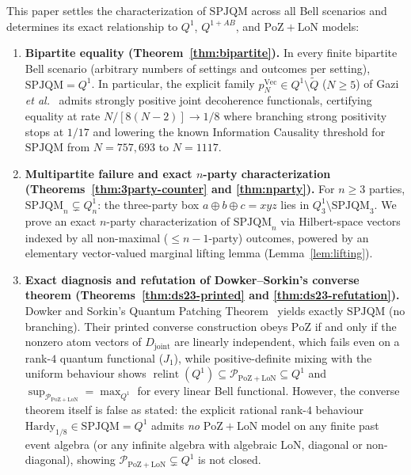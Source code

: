 \documentclass[11pt,a4paper]{article}
\theoremstyle{definition}
\theoremstyle{remark}
\newcommand{\SPJQM}{\mathrm{SPJQM}}
\newcommand{\Qone}{Q^{1}}
\newcommand{\QAB}{Q^{1+AB}}
\newcommand{\tQ}{\widetilde{Q}}
\newcommand{\PoZ}{\mathrm{PoZ}}
\newcommand{\LoN}{\mathrm{LoN}}
\newcommand{\PPoZ}{\mathcal{P}_{\PoZ+\LoN}}
\newcommand{\relint}{\operatorname{relint}}
\begin{document}
This paper settles the characterization of $\SPJQM$ across all Bell scenarios and determines its exact relationship to $\Qone$, $\QAB$, and $\PoZ+\LoN$ models:
\begin{enumerate}[leftmargin=*,nosep]
\item \textbf{Bipartite equality (Theorem~\ref{thm:bipartite}).} In every finite bipartite Bell scenario (arbitrary numbers of settings and outcomes per setting), $\SPJQM = \Qone$. In particular, the explicit family $p^{\mathrm{Vec}}_N \in \Qone \setminus \tQ$ ($N \ge 5$) of Gazi \emph{et al.}~\cite{Gazi2026} admits strongly positive joint decoherence functionals, certifying equality at rate $N/[8(N-2)] \to 1/8$ where branching strong positivity stops at $1/17$ and lowering the known Information Causality threshold for $\SPJQM$ from $N = 757{,}693$ to $N = 1117$.
\item \textbf{Multipartite failure and exact $n$-party characterization (Theorems~\ref{thm:3party-counter} and \ref{thm:nparty}).} For $n \ge 3$ parties, $\SPJQM_n \subsetneq \Qone_n$: the three-party box $a\oplus b\oplus c = xyz$ lies in $\Qone_3 \setminus \SPJQM_3$. We prove an exact $n$-party characterization of $\SPJQM_n$ via Hilbert-space vectors indexed by all non-maximal ($\le n-1$-party) outcomes, powered by an elementary vector-valued marginal lifting lemma (Lemma~\ref{lem:lifting}).
\item \textbf{Exact diagnosis and refutation of Dowker--Sorkin's converse theorem (Theorems~\ref{thm:ds23-printed} and \ref{thm:ds23-refutation}).} Dowker and Sorkin's Quantum Patching Theorem~\cite{DowkerSorkin2023} yields exactly $\SPJQM$ (no branching). Their printed converse construction obeys $\PoZ$ if and only if the nonzero atom vectors of $D_{\mathrm{joint}}$ are linearly independent, which fails even on a rank-$4$ quantum functional ($J_1$), while positive-definite mixing with the uniform behaviour shows $\relint(\Qone) \subseteq \PPoZ \subseteq \Qone$ and $\sup_{\PPoZ} = \max_{\Qone}$ for every linear Bell functional. However, the converse theorem itself is false as stated: the explicit rational rank-$4$ behaviour $\mathrm{Hardy}_{1/8} \in \SPJQM = \Qone$ admits \emph{no} $\PoZ+\LoN$ model on any finite past event algebra (or any infinite algebra with algebraic $\LoN$, diagonal or non-diagonal), showing $\PPoZ \subsetneq \Qone$ is not closed.

\end{enumerate}
\end{document}
